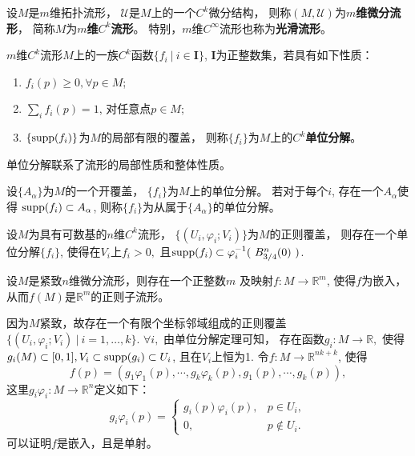 \begin{defn}
  设$M$是$m$维拓扑流形，
  $\mathscr{U}$是$M$上的一个$C^k$微分结构，
  则称$(M,\mathscr{U})$为$m$\textbf{维微分流形}，
  简称$M$为\textbf{$m$维$C^k$流形}。
  特别，$m$维$C^{\infty}$流形也称为\textbf{光滑流形}。
\end{defn}

\begin{defn}
  $m$维$C^k$流形$M$上的一族$C^k$函数$\{f_i\ \vert\ i\in \mathbf{I}\}$,
  $\mathbf{I}$为正整数集，若具有如下性质：
  \begin{enumerate}
  \item $f_i(p)\geq 0, \forall p\in M$;
  \item $\sum_{i}f_i(p)=1$, 对任意点$p\in M$;
  \item $\{\textmd{supp}(f_i)\}$为$M$的局部有限的覆盖，
    则称$\{f_i\}$为$M$上的$C^k$\textbf{单位分解}。
  \end{enumerate}
\end{defn}

\begin{rem}
  单位分解联系了流形的局部性质和整体性质。
\end{rem}

\begin{defn}\label{defn:unitDecompose}
  设$\{A_\alpha\}$为$M$的一个开覆盖，
  $\{f_i\}$为$M$上的单位分解。
  若对于每个$i$, 存在一个$A_\alpha$使得
  $\textmd{supp}(f_i)\subset A_\alpha$,
  则称$\{f_i\}$为从属于$\{A_\alpha\}$的单位分解。
\end{defn}

\begin{thm}[单位分解定理]
  设$M$为具有可数基的$n$维$C^k$流形，
  $\{(U_i,\varphi_i;V_i)\}$为$M$的正则覆盖，
  则存在一个单位分解$\{f_i\}$,
  使得在$V_i$上$f_i> 0,$
  且$\textmd{supp}(f_i)\subset \varphi^{-1}_i(\ B_{3/4}^n(0)\ )$.
\end{thm}

\begin{thm}\label{thm:imbedding}
  设$M$是紧致$n$维微分流形，则存在一个正整数$m$
  及映射$f:M\rightarrow \mathbb{R}^m$,
  使得$f$为嵌入，
  从而$f(M)$是$\mathbb{R}^m$的正则子流形。
\end{thm}
\begin{pro}
  因为$M$紧致，故存在一个有限个坐标邻域组成的正则覆盖
  $\{(U_i,\varphi_i;V_i) \ \vert \ i=1,\ldots,k\}.$
  $\forall i,$ 由单位分解定理可知，
  存在函数$g_i:M\rightarrow \mathbb{R},$
  使得$g_i(M)\subset [0,1], V_i\subset \textmd{supp}(g_i)\subset U_i$,
  且在$V_i$上恒为1.
  令$f:M\rightarrow \mathbb{R}^{nk+k}$,
  使得
  \begin{equation}
    f(p) = (g_1\varphi_1(p),\cdots,g_k\varphi_k(p),g_1(p),\cdots,g_k(p)),
  \end{equation}
这里$g_i\varphi_i:M\rightarrow \mathbb{R}^n$定义如下：
\begin{equation}
  g_i\varphi_i(p)=
  \begin{cases}
    g_i(p)\varphi_i(p), &p \in U_i,\\
    0, &p \notin U_i.
  \end{cases}
\end{equation}
可以证明$f$是嵌入，且是单射。
\end{pro}

